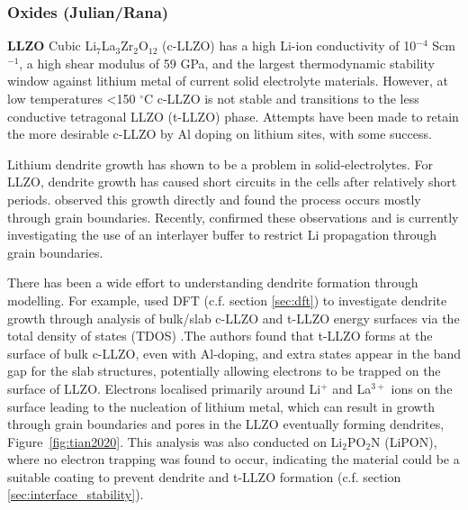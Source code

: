\documentclass[../main.tex]{subfiles}
\begin{document}
\subsubsection{Oxides (Julian/Rana)}
\label{sec:se_oxides}
\textbf{LLZO} Cubic Li$_7$La$_3$Zr$_2$O$_{12}$ (c-LLZO) has a high Li-ion conductivity of 10$^{-4}$ Scm$^{-1}$\cite{Murugan2007}, a high shear modulus of 59 GPa\cite{Ni2012}, and the largest thermodynamic stability window against lithium metal\cite{Zhu2016, Binninger2020} of current solid electrolyte materials. However, at low temperatures <150 $^\circ$C c-LLZO is not stable and transitions to the less conductive tetragonal LLZO (t-LLZO) phase.\cite{Geiger2011} Attempts have been made to retain the more desirable c-LLZO by Al doping on lithium sites, with some success.\cite{Geiger2011, Rangasamy2012}

Lithium dendrite growth has shown to be a problem in solid-electrolytes. For LLZO, dendrite growth has caused short circuits in the cells after relatively short periods\cite{Ren2015,Sudo2014}. \citeauthor{Cheng2017} observed this growth directly and found the process occurs mostly through grain boundaries.\cite{Cheng2017} Recently, \citeauthor{Kim2020} confirmed these observations and is currently investigating the use of an interlayer buffer to restrict Li propagation through grain boundaries.\cite{Kim2020}

There has been a wide effort to understanding dendrite formation through modelling\cite{Canepa2018, Tian2018, Gao2020}. For example, \citeauthor{Tian2018} used DFT (c.f. section \ref{sec:dft}) to investigate dendrite growth through analysis of bulk/slab c-LLZO and t-LLZO energy surfaces via the total density of states (TDOS)  \cite{Tian2018}.The authors found that t-LLZO forms at the surface of bulk c-LLZO, even with Al-doping\cite{Ma2016, Rettenwander2018}, and extra states appear in the band gap for the slab structures, potentially allowing electrons to be trapped on the surface of LLZO. Electrons localised primarily around Li$^+$ and La$^{3+}$ ions on the surface leading to the nucleation of lithium metal, which can result in growth through grain boundaries and pores in the LLZO eventually forming dendrites\cite{Ren2015}, Figure~\ref{fig:tian2020}. This analysis was also conducted on Li$_2$PO$_2$N (LiPON), where no electron trapping was found to occur, indicating the material could be a suitable coating to prevent dendrite and t-LLZO formation (c.f. section \ref{sec:interface_stability}).
\end{document}
